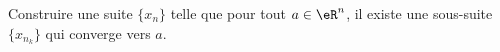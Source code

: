 
\begin{exercice}\label{exo0015}

Construire une suite $\{x_n\}$ telle que pour tout $a\in \eR^n$, il existe une sous-suite $\{x_{n_k}\}$ qui converge vers $a$.

\end{exercice}
